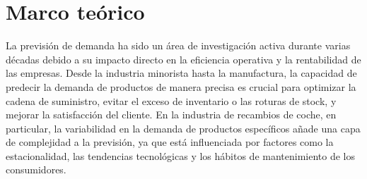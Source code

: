 \chapter{Marco teórico}\label{cap2}




La previsión de demanda ha sido un área de investigación activa durante varias décadas debido a su impacto directo en la eficiencia operativa y la rentabilidad de las empresas. Desde la industria minorista hasta la manufactura, la capacidad de predecir la demanda de productos de manera precisa es crucial para optimizar la cadena de suministro, evitar el exceso de inventario o las roturas de stock, y mejorar la satisfacción del cliente. En la industria de recambios de coche, en particular, la variabilidad en la demanda de productos específicos añade una capa de complejidad a la previsión, ya que está influenciada por factores como la estacionalidad, las tendencias tecnológicas y los hábitos de mantenimiento de los consumidores.

